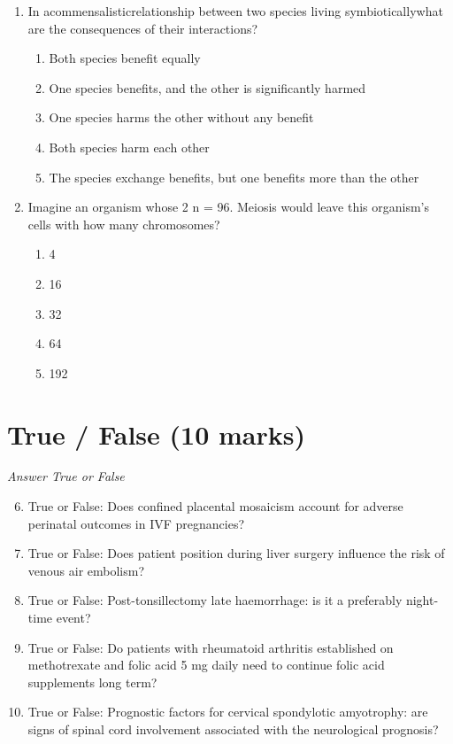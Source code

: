 \documentclass[12pt]{article}
\begin{document}
\begin{enumerate}[label=\arabic*.]
\begin{enumerate}[label=(\alph*)]
    \item Acetylcholine will be excessively produced in the synaptic cleft.
    \item Acetylcholine will not be transported to the synaptic cleft.
\end{enumerate}
\item In acommensalisticrelationship between two species living symbioticallywhat are the consequences of their interactions?
\begin{enumerate}[label=(\alph*)]
    \item Both species benefit equally
    \item One species benefits, and the other is significantly harmed
    \item One species harms the other without any benefit
    \item Both species harm each other
    \item The species exchange benefits, but one benefits more than the other
\end{enumerate}
\item Imagine an organism whose 2 n = 96. Meiosis would leave this organism's cells with how many chromosomes?
\begin{enumerate}[label=(\alph*)]
    \item 4
    \item 16
    \item 32
    \item 64
    \item 192
\end{enumerate}
\end{enumerate}

\section*{True / False (10 marks)}
\textit{Answer True or False}
\begin{enumerate}[label=\arabic*.]
\setcounter{enumi}{5}
\item True or False: Does confined placental mosaicism account for adverse perinatal outcomes in IVF pregnancies?
\item True or False: Does patient position during liver surgery influence the risk of venous air embolism?
\item True or False: Post-tonsillectomy late haemorrhage: is it a preferably night-time event?
\item True or False: Do patients with rheumatoid arthritis established on methotrexate and folic acid 5 mg daily need to continue folic acid supplements long term?
\item True or False: Prognostic factors for cervical spondylotic amyotrophy: are signs of spinal cord involvement associated with the neurological prognosis?
\end{enumerate}
\end{document}
